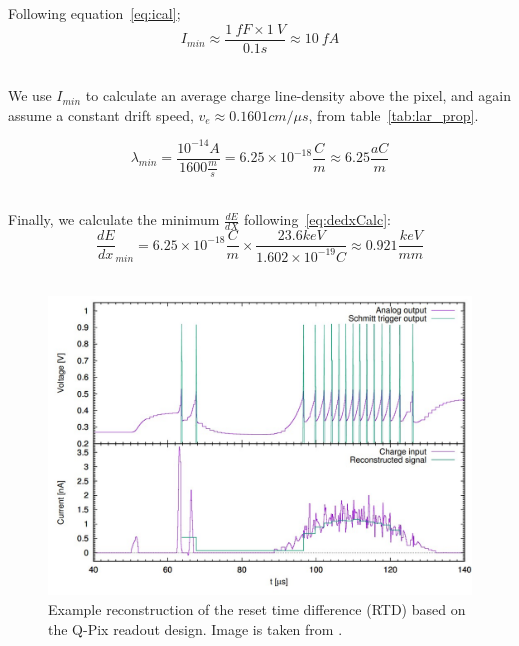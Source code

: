Following equation~\ref{eq:ical};
\begin{equation}
I_{min} \approx \frac{1~fF \times  1~V}{0.1 \unit{s}} \approx 10~\unit{fA}
\end{equation}~\label{eq:icalc_min}

We use $I_{min}$ to calculate an average charge line-density above the pixel, and again assume a constant drift speed, $v_{e} \approx 0.1601 \unit{cm/\mu s}$, from table~\ref{tab:lar_prop}.

\begin{equation}
\lambda_{min} = \frac{10^{-14} A}{1600 \frac{m}{s}} = 6.25\times 10^{-18} \frac{C}{m} \approx 6.25 \frac{aC}{m}
\end{equation}
~\label{eq:lambdaCalc}

Finally, we calculate the minimum $\frac{dE}{dX}$ following~\ref{eq:dedxCalc}:
\begin{equation}
\frac{dE}{dx}_{min} = 6.25\times 10^{-18} \frac{C}{m} \times  \frac{23.6 keV}{1.602\times 10^{-19} C} \approx 0.921 \frac{keV}{mm}
\end{equation}
~\label{eq:dedxCalc}

\begin{figure}[]
\centering
\includegraphics[width=\textwidth]{images/qpix_rtd_reconstruction_example.jpg}
\caption{Example reconstruction of the reset time difference (RTD) based on the Q-Pix readout design. Image is taken from \citep{qpix:nygren:mei}.}
\end{figure}
~\label{fig:qpixRecon1}


